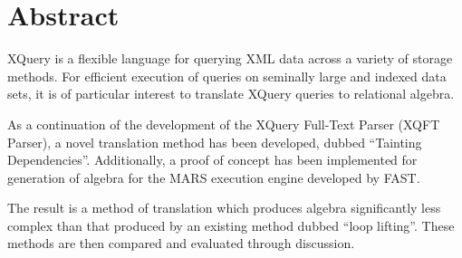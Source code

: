 \chapter*{Abstract}
XQuery is a flexible language for querying XML data across a variety of storage
methods. For efficient execution of queries on seminally large and indexed data
sets, it is of particular interest to translate XQuery queries to relational
algebra.

As a continuation of the development of the XQuery Full-Text Parser (XQFT
Parser)\cite{ourselves}, a novel translation method has been developed, dubbed
``Tainting Dependencies''. Additionally, a proof of concept has been
implemented for generation of algebra for the MARS execution engine developed
by FAST.

The result is a method of translation which produces algebra significantly less
complex than that produced by an existing method dubbed ``loop lifting''. These
methods are then compared and evaluated through discussion.